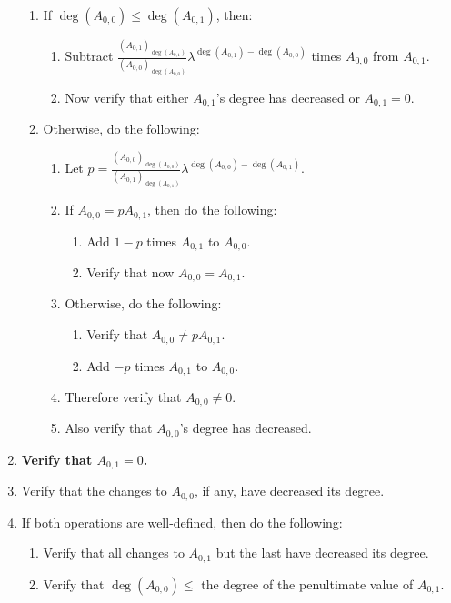 \documentclass{article}
\begin{document}
\begin{multicols}{2}
\begin{enumerate}
\begin{enumerate}
						\item If $\deg(A_{0,0})\le\deg(A_{0,1})$, then:
						\begin{enumerate}
							\item Subtract $\frac{(A_{0,1})_{\deg(A_{0,1})}}{(A_{0,0})_{\deg(A_{0,0})}}\lambda^{\deg(A_{0,1})-\deg(A_{0,0})}$ times $A_{0,0}$ from $A_{0,1}$.
							\item Now verify that either $A_{0,1}$'s degree has decreased or $A_{0,1}=0$.
						\end{enumerate}
						\item Otherwise, do the following:
						\begin{enumerate}
							\item Let $p=\frac{(A_{0,0})_{\deg(A_{0,0})}}{(A_{0,1})_{\deg(A_{0,1})}}\lambda^{\deg(A_{0,0})-\deg(A_{0,1})}$.
							\item If $A_{0,0}=pA_{0,1}$, then do the following:
							\begin{enumerate}
								\item Add $1-p$ times $A_{0,1}$ to $A_{0,0}$.
								\item Verify that now $A_{0,0}=A_{0,1}$.
							\end{enumerate}
							\item Otherwise, do the following:
							\begin{enumerate}
								\item Verify that $A_{0,0}\ne pA_{0,1}$.
								\item Add $-p$ times $A_{0,1}$ to $A_{0,0}$.
							\end{enumerate}
							\item Therefore verify that $A_{0,0}\ne 0$.
							\item Also verify that $A_{0,0}$'s degree has decreased.
						\end{enumerate}
					\end{enumerate}
					\item \textbf{Verify that $A_{0,1}=0$.}
					\item Verify that the changes to $A_{0,0}$, if any, have decreased its degree.
					\item If both operations are well-defined, then do the following:
					\begin{enumerate}
						\item Verify that all changes to $A_{0,1}$ but the last have decreased its degree.
						\item Verify that $\deg(A_{0,0})\le$ the degree of the penultimate value of $A_{0,1}$.

\end{enumerate}
\end{enumerate}
\end{multicols}
\end{document}
